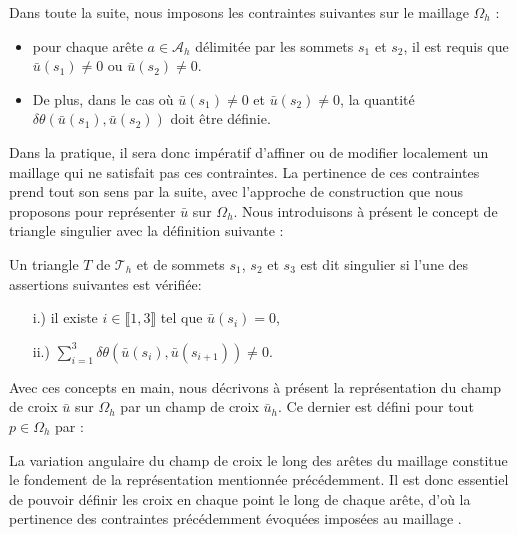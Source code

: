 Dans toute la suite, nous imposons les contraintes suivantes sur le maillage $\Omega_h$ :\\[-0.2cm]
\begin{itemize}
 \item pour chaque arête $a\in\mathcal{A}_h$ délimitée par les sommets $s_1$ et $s_2$, il est requis que $\bar{u}(s_1)\neq 0$ ou $\bar{u}(s_2)\neq 0$.\\[-0.2cm]
 \item De plus, dans le cas où $\bar{u}(s_1)\neq 0$ et $\bar{u}(s_2)\neq 0$, la quantité $\delta\theta(\bar{u}(s_1), \bar{u}(s_2))$ doit être définie.\\[-0.2cm]
\end{itemize}
Dans la pratique, il sera donc impératif d'affiner ou de modifier localement un maillage qui ne satisfait pas ces contraintes. La pertinence de ces contraintes prend tout son sens par la suite, avec l'approche de construction que nous proposons pour représenter $\bar{u}$ sur $\Omega_h$. Nous introduisons à présent le concept de triangle singulier avec la définition suivante :

\begin{definition}
\label{def:triangle_singulier}
 Un triangle $T$ de $\mathcal{T}_h$ et de sommets $s_1$, $s_2$ et $s_3$ est dit singulier si l'une des assertions suivantes est vérifiée:\\[-0.2cm]
 \begin{itemize}
  \item[i.)] il existe $i\in\llbracket 1, 3\rrbracket$ tel que $\bar{u}(s_i)=0$,\\[-0.2cm]
  \item[ii.)] $\sum_{i=1}^3\delta\theta(\bar{u}(s_i),\bar{u}(s_{i+1}))\neq 0$.
 \end{itemize}

\end{definition}

Avec ces concepts en main, nous décrivons à présent la représentation du champ de croix $\bar{u}$ sur $\Omega_h$ par un champ de croix $\bar{u}_h$. Ce dernier est défini pour tout $p\in\Omega_h$ par :\\


\begin{remark}
La variation angulaire du champ de croix le long des arêtes du maillage constitue le fondement de la représentation mentionnée précédemment. Il est donc essentiel de pouvoir définir les croix en chaque point le long de chaque arête, d'où la pertinence des contraintes précédemment évoquées imposées au maillage .
\end{remark}


